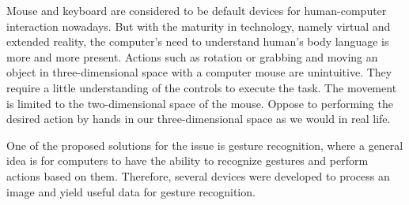 Mouse and keyboard are considered to be default devices for human-computer interaction nowadays. But with the maturity in technology, namely virtual and extended reality, the computer's need to understand human's body language is more and more present. Actions such as rotation or grabbing and moving an object in three-dimensional space with a computer mouse are unintuitive. They require a little understanding of the controls to execute the task. The movement is limited to the two-dimensional space of the mouse. Oppose to performing the desired action by hands in our three-dimensional space as we would in real life.

One of the proposed solutions for the issue is gesture recognition, where a general idea is for computers to have the ability to recognize gestures and perform actions based on them. Therefore, several devices were developed to process an image and yield useful data for gesture recognition.